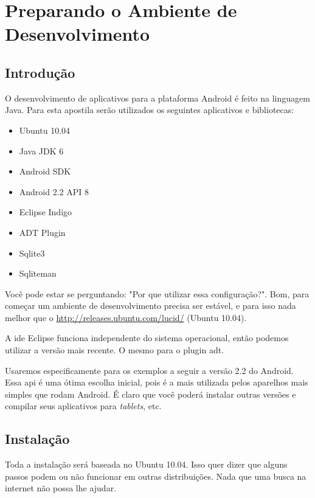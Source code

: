 \chapter{Preparando o Ambiente de Desenvolvimento}

\section{Introdução}

O desenvolvimento de aplicativos para a plataforma Android é feito na linguagem Java.
Para esta apostila serão utilizados os seguintes aplicativos e bibliotecas:

\begin{itemize}
\item Ubuntu 10.04
\item Java JDK 6
\item Android SDK
\item Android 2.2 API 8
\item Eclipse Indigo
\item ADT Plugin
\item Sqlite3
\item Sqliteman
\end{itemize}

Você pode estar se perguntando: "Por que utilizar essa configuração?". Bom, para começar
um ambiente de desenvolvimento precisa ser estável, e para isso nada melhor que o
\url{http://releases.ubuntu.com/lucid/} (Ubuntu 10.04).

A \gls{ide} Eclipse funciona independente do sistema operacional, então podemos utilizar a versão
mais recente. O mesmo para o plugin \gls{adt}.

Usaremos especificamente para os exemplos a seguir a versão 2.2 do Android. Essa \gls{api} é uma
ótima escolha inicial, pois é a mais utilizada pelos aparelhos mais simples que rodam Android.
É claro que você poderá instalar outras versões e compilar seus aplicativos para \textit{tablets}, etc.

\section{Instalação}

Toda a instalação será baseada no Ubuntu 10.04. Isso quer dizer que alguns passos podem ou não
funcionar em outras distribuições. Nada que uma busca na internet não possa lhe ajudar.


